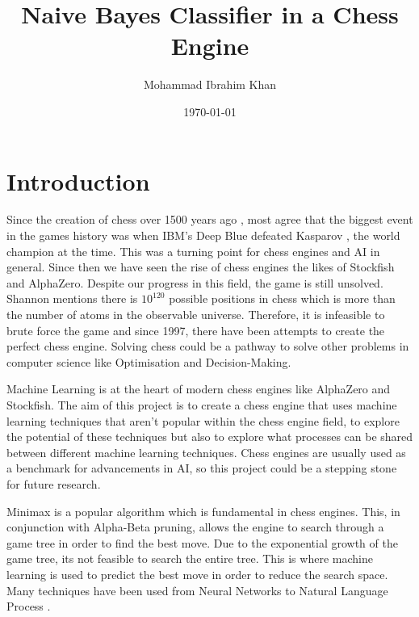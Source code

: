 \documentclass[20pt]{informatics-report}
\title{Naive Bayes Classifier in a Chess Engine}
\author{Mohammad Ibrahim Khan}
\date{\today}
\begin{document}
\createFrontMatter
\onehalfspacing
\tableofcontents
\doublespacing


\chapter{Introduction}


Since the creation of chess over 1500 years ago \cite{davidsonShortHistoryChess2012}, most agree that the biggest event in the games history was when IBM's Deep Blue defeated Kasparov \cite{hsuIBMsDeepBlue1999}, the world champion at the time. This was a turning point for chess engines and AI in general.
Since then we have seen the rise of chess engines the likes of Stockfish and AlphaZero. Despite our progress in this field, the game is still unsolved. Shannon mentions there is $10^{120}$ possible positions in chess \cite{shannonXXIIProgrammingComputer1950} which is more than the number of atoms in the observable universe. Therefore, it is infeasible to brute force the game and since 1997, there have been attempts to create the perfect chess engine. Solving chess could be a pathway to solve other problems in computer science like Optimisation
and Decision-Making. 

Machine Learning is at the heart of modern chess engines like AlphaZero and Stockfish.  
The aim of this project is to create a chess engine that uses machine learning techniques that aren't popular within the chess engine field, to explore the potential of these techniques but also to explore what processes can be shared between different machine learning techniques.
Chess engines are usually used as a benchmark for advancements in AI, so this project could be a stepping stone for future research. 

Minimax is a popular algorithm which is fundamental in chess engines. This, in conjunction with Alpha-Beta pruning, allows the engine to search through a game tree in order to find the best move. Due to the exponential growth of the game tree, its not feasible to search the entire tree. This is where machine learning is used to predict the best move in order to reduce the search space. Many techniques have been used from Neural Networks \cite{kleinNeuralNetworksChess2022} to Natural Language Process \cite{NLPinChess}. 
\end{document}
